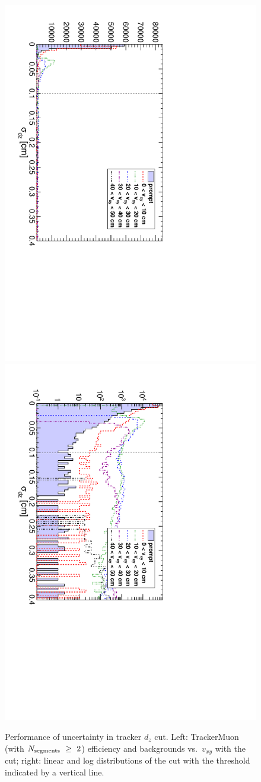 \documentclass[12pt]{article}
\newcommand{\s}[1]{{\mbox{\scriptsize #1}}}
\begin{document}
\begin{figure}
\begin{center}
\begin{multicols}{2}
\includegraphics[height=\linewidth, angle=90]{fig/backgrounds3_plot/trackslinear_dzerr.pdf}
\includegraphics[height=\linewidth, angle=90]{fig/backgrounds3_plot/trackslog_dzerr.pdf}
\end{multicols}

\caption{Performance of uncertainty in tracker $d_z$ cut.  Left: TrackerMuon (with $N_\s{segments}~\ge~2$) efficiency and backgrounds vs.\ $v_{xy}$ with the cut; right: linear and log distributions of the cut with the threshold indicated by a vertical line. \label{fig:dzerr}}
\end{center}
\end{figure}
\end{document}
